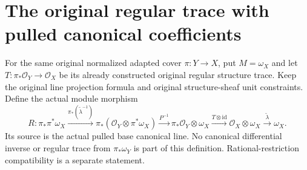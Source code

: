 \section{The original regular trace with pulled canonical coefficients}

\begin{definition}
\label{def:nadel-regular-pulled-canonical-trace}
\leanok
For the same original normalized adapted cover $\pi:Y\to X$, put
$M=\omega_X$ and let $T:\pi_*\mathcal O_Y\to\mathcal O_X$ be its
already constructed original regular structure trace.  Keep the original
line projection formula and original structure-sheaf unit constraints.
Define the actual module morphism
\[
 R:\pi_*\pi^*\omega_X
  \xrightarrow{\pi_*(\widetilde\lambda^{-1})}
    \pi_*(\mathcal O_Y\otimes\pi^*\omega_X)
  \xrightarrow{P^{-1}}\pi_*\mathcal O_Y\otimes\omega_X
  \xrightarrow{T\otimes\mathrm{id}}\mathcal O_X\otimes\omega_X
  \xrightarrow{\widetilde\lambda}\omega_X.
\]
Its source is the actual pulled base canonical line.  No canonical
differential inverse or regular trace from $\pi_*\omega_Y$ is part of
this definition.  Rational-restriction compatibility is a separate
statement.
\end{definition}

